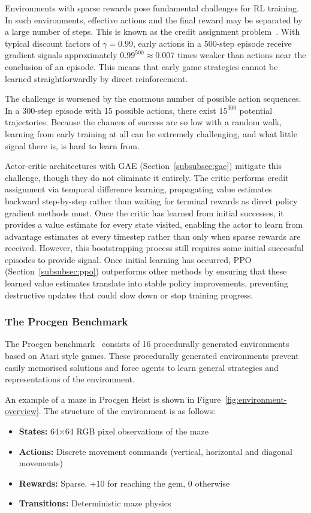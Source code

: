 Environments with sparse rewards pose fundamental challenges for RL training. In such environments, effective actions and the final reward may be separated by a large number of steps. This is known as the credit assignment problem~\citep{sutton_1999_policy}. With typical discount factors of $\gamma=0.99$, early actions in a 500-step episode receive gradient signals approximately $0.99^{500} \approx 0.007$ times weaker than actions near the conclusion of an episode. This means that early game strategies cannot be learned straightforwardly by direct reinforcement.

The challenge is worsened by the enormous number of possible action sequences. In a 300-step episode with 15 possible actions, there exist $15^{300}$ potential trajectories. Because the chances of success are so low with a random walk, learning from early training at all can be extremely challenging, and what little signal there is, is hard to learn from.

Actor-critic architectures with GAE (Section~\ref{subsubsec:gae}) mitigate this challenge, though they do not eliminate it entirely. The critic performs credit assignment via temporal difference learning, propagating value estimates backward step-by-step rather than waiting for terminal rewards as direct policy gradient methods must. Once the critic has learned from initial successes, it provides a value estimate for every state visited, enabling the actor to learn from advantage estimates at every timestep rather than only when sparse rewards are received. However, this bootstrapping process still requires some initial successful episodes to provide signal. Once initial learning has occurred, PPO (Section~\ref{subsubsec:ppo}) outperforms other methods by ensuring that these learned value estimates translate into stable policy improvements, preventing destructive updates that could slow down or stop training progress.


\subsubsection{The Procgen Benchmark}\label{subsubsec:procgen_benchmark}
The Procgen benchmark~\citep{cobbe_2020_leveraging} consists of 16 procedurally generated environments based on Atari style games. These procedurally generated environments prevent easily memorised solutions and force agents to learn general strategies and representations of the environment.

An example of a maze in Procgen Heist is shown in Figure~\ref{fig:environment-overview}. The structure of the environment is as follows:
\begin{itemize}
    \item \textbf{States:} 64×64 RGB pixel observations of the maze
    \item \textbf{Actions:} Discrete movement commands (vertical, horizontal and diagonal movements)
    \item \textbf{Rewards:} Sparse. +10 for reaching the gem, 0 otherwise
    \item \textbf{Transitions:} Deterministic maze physics
\end{itemize}



